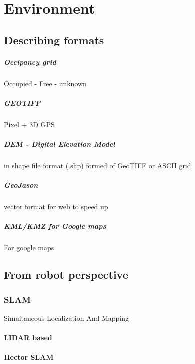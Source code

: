 \chapter{Environment}

\section{Describing formats}
    \paragraph{Occipancy grid}
        Occupied - Free  - unknown
    
    
    \paragraph{GEOTIFF}
        Pixel + 3D GPS
        
    \paragraph{DEM - Digital Elevation Model}
        in shape file format (.shp) formed of GeoTIFF or ASCII grid
        
    \paragraph{GeoJason}
        vector format for web to speed up
        
    \paragraph{KML/KMZ for Google maps}
        For google maps


\section {From robot perspective}
    \subsection{SLAM}
        Simultaneous Localization And Mapping
        \subsubsection{LIDAR based}
            \subsubsection{Hector SLAM}

